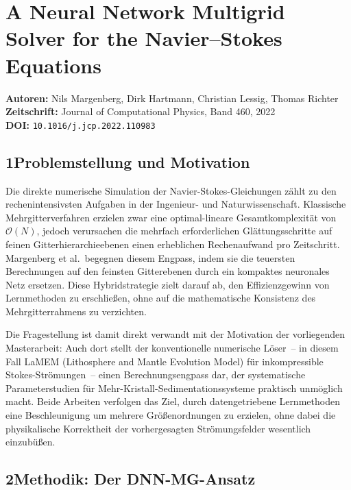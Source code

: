 \documentclass[a4paper,12pt]{article}
\begin{document}
\section*{A Neural Network Multigrid Solver for the Navier--Stokes Equations}

\textbf{Autoren:} Nils Margenberg, Dirk Hartmann, Christian Lessig, Thomas Richter \\
\textbf{Zeitschrift:} Journal of Computational Physics, Band 460, 2022 \\
\textbf{DOI:} \texttt{10.1016/j.jcp.2022.110983}

\subsection*{1\quad Problemstellung und Motivation}

Die direkte numerische Simulation der Navier-Stokes-Gleichungen zählt zu den
rechenintensivsten Aufgaben in der Ingenieur- und Naturwissenschaft. Klassische
Mehrgitterverfahren erzielen zwar eine optimal-lineare Gesamtkomplexität von
$\mathcal{O}(N)$, jedoch verursachen die mehrfach erforderlichen Glättungsschritte
auf feinen Gitterhierarchieebenen einen erheblichen Rechenaufwand pro Zeitschritt.
Margenberg et al.\ begegnen diesem Engpass, indem sie die teuersten Berechnungen auf
den feinsten Gitterebenen durch ein kompaktes neuronales Netz ersetzen.
Diese Hybridstrategie zielt darauf ab, den Effizienzgewinn von Lernmethoden
zu erschließen, ohne auf die mathematische Konsistenz des Mehrgitterrahmens
zu verzichten.

Die Fragestellung ist damit direkt verwandt mit der Motivation der vorliegenden
Masterarbeit: Auch dort stellt der konventionelle numerische Löser~-- in diesem
Fall LaMEM (Lithosphere and Mantle Evolution Model) für inkompressible
Stokes-Strömungen~-- einen Berechnungsengpass dar, der systematische
Parameterstudien für Mehr-Kristall-Sedimentationssysteme praktisch unmöglich
macht. Beide Arbeiten verfolgen das Ziel, durch datengetriebene Lernmethoden
eine Beschleunigung um mehrere Größenordnungen zu erzielen, ohne dabei die
physikalische Korrektheit der vorhergesagten Strömungsfelder wesentlich einzubüßen.

\subsection*{2\quad Methodik: Der DNN-MG-Ansatz}
\end{document}
